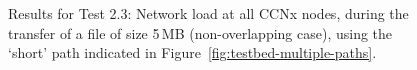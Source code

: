 \begin{figure}[H]
    \centering


    \cprotect\caption{Results for Test 2.3: Network load at 
        all CCNx nodes, during the transfer of a file of size 5\,MB 
        (non-overlapping case), using the `short' path indicated in 
        Figure~\ref{fig:testbed-multiple-paths}.}
    \label{fig:short-route-app}

\end{figure}

